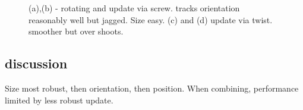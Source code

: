 \begin{figure}
{\begin{minipage}[b]{0.45\columnwidth}
 	\end{minipage}}
 	\caption{(a),(b) - rotating and update via screw. tracks orientation reasonably well but jagged. Size easy. (c) and (d) update via twist. smoother but over shoots. }
 	\label{fig:orientation_size_rotating}
\end{figure}

\subsection{discussion}
Size most robust, then orientation, then position. When combining, performance limited by less robust update.

